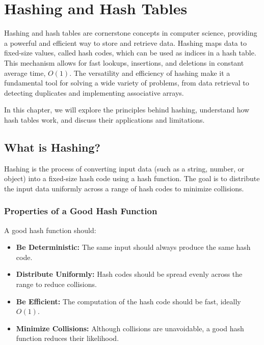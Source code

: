 \chapter{Hashing and Hash Tables}
\label{chap:Hashing_and_Hash_Tables}

Hashing and hash tables are cornerstone concepts in computer science, providing a powerful and efficient way to store and retrieve data. Hashing maps data to fixed-size values, called hash codes, which can be used as indices in a hash table. This mechanism allows for fast lookups, insertions, and deletions in constant average time, \(O(1)\). The versatility and efficiency of hashing make it a fundamental tool for solving a wide variety of problems, from data retrieval to detecting duplicates and implementing associative arrays.

In this chapter, we will explore the principles behind hashing, understand how hash tables work, and discuss their applications and limitations.

\section*{What is Hashing?}
Hashing is the process of converting input data (such as a string, number, or object) into a fixed-size hash code using a hash function. The goal is to distribute the input data uniformly across a range of hash codes to minimize collisions.

\subsection*{Properties of a Good Hash Function}
A good hash function should:
\begin{itemize}
    \item \textbf{Be Deterministic:} The same input should always produce the same hash code.
    \item \textbf{Distribute Uniformly:} Hash codes should be spread evenly across the range to reduce collisions.
    \item \textbf{Be Efficient:} The computation of the hash code should be fast, ideally \(O(1)\).
    \item \textbf{Minimize Collisions:} Although collisions are unavoidable, a good hash function reduces their likelihood.
\end{itemize}


